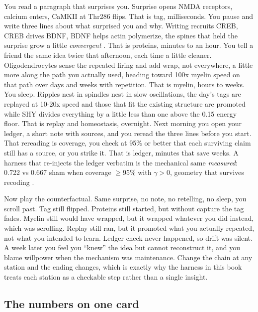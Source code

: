 You read a paragraph that surprises you. Surprise opens NMDA receptors, calcium enters, CaMKII at Thr286 flips. That is tag, milliseconds. You pause and write three lines about what surprised you and why. Writing recruits CREB, CREB drives BDNF, BDNF helps actin polymerize, the spines that held the surprise grow a little \textit{convergent} \citep{kandel2000}. That is proteins, minutes to an hour. You tell a friend the same idea twice that afternoon, each time a little cleaner. Oligodendrocytes sense the repeated firing and add wrap, not everywhere, a little more along the path you actually used, heading toward 100x myelin speed on that path over days and weeks with repetition. That is myelin, hours to weeks. You sleep. Ripples nest in spindles nest in slow oscillations, the day's tags are replayed at 10-20x speed and those that fit the existing structure are promoted while SHY divides everything by a little less than one above the 0.15 energy floor. That is replay and homeostasis, overnight. Next morning you open your ledger, a short note with sources, and you reread the three lines before you start. That rereading is coverage, you check at 95\% or better that each surviving claim still has a source, or you strike it. That is ledger, minutes that save weeks. A harness that re-injects the ledger verbatim is the mechanical same \textit{measured}: 0.722 vs 0.667 sham when coverage $\geq$95\% with $\gamma>0$, geometry that survives recoding \citep{jha2025}.

Now play the counterfactual. Same surprise, no note, no retelling, no sleep, you scroll past. Tag still flipped. Proteins still started, but without capture the tag fades. Myelin still would have wrapped, but it wrapped whatever you did instead, which was scrolling. Replay still ran, but it promoted what you actually repeated, not what you intended to learn. Ledger check never happened, so drift was silent. A week later you feel you ``knew'' the idea but cannot reconstruct it, and you blame willpower when the mechanism was maintenance. Change the chain at any station and the ending changes, which is exactly why the harness in this book treats each station as a checkable step rather than a single insight.

\subsection*{The numbers on one card}

